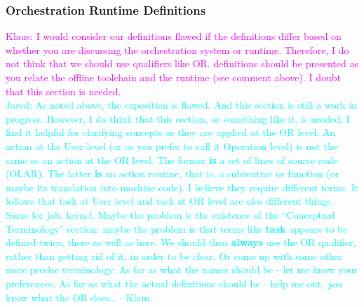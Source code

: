 \documentclass{article}
\newcommand{\JaredRfromKW}[1]   {\textcolor{cyan}{Jared: #1 - Klaus.}}
\newcommand{\Klaus}[1]          {\textcolor{magenta}{Klaus: #1}}
\newcommand{\shortOLAR}  {OLAR\xspace}
\newcommand{\shortOR}   {OR\xspace}
\newcommand{\OLAR}   {\shortOLAR}             %
\newcommand{\OR}        {\shortOR}
\newcommand{\actionroutine}        {action routine\xspace}       %
\begin{document}
\subsubsection[\shortOR Definitions]{Orchestration Runtime Definitions}
\label{sec:ORCodeTerminology}
\Klaus{I would consider our definitions flawed if the definitions
differ based on whether you are discussing the orchestration system or runtime.
Therefore, I do not think that we should use qualifiers like OR.
definitions should be presented as you relate the offline toolchain and the
runtime (see comment above).  I doubt that this section is needed.}\\
\JaredRfromKW{As noted above, the exposition is flawed. And this section is
still a work in progress.
However, I do think that this section, or something like it, is needed.
I find it helpful for clarifying concepts as they are applied at the
OR level. An action at the User level (or as you prefer to call it
Operation level) is not the same as an action at the OR level.
The former \textbf{is} a set of lines of source code (\OLAR). The latter
\textbf{is} an \actionroutine, that is, a subroutine or function
(or maybe its translation into machine code). I believe they require
different terms. It follows that task at User level and
task at \OR level are also different things. Same for job, kernel.
Maybe the problem is the existence of the ``Conceptual Terminology'' section:
maybe the problem is that terms like \textbf{task} appears to be defined twice,
there as well as here. We should then \textbf{always} use the
OR qualifier, rather than getting rid of it, in order to be
clear. Or come up with some other more precise terminology.
As far as what the names should be - let me know your preferences.
As far as what the actual definitions should be - help me out,
\emph{you} know what the \OR does\ldots}\\
\end{document}
